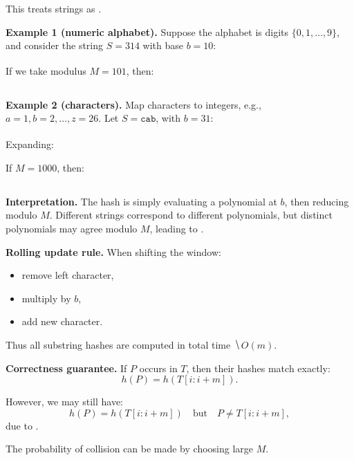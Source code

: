 \documentclass[11pt]{exam}
\begin{document}
This treats strings as .

\vspace{0.5em}

\textbf{Example 1 (numeric alphabet).}
Suppose the alphabet is digits $\{0,1,\dots,9\}$, and consider the string $S = 314$ with base $b = 10$:
\[
\phantom{h(S) = 3 \cdot 10^2 + 1 \cdot 10^1 + 4 \cdot 10^0 = 314.}
\]
If we take modulus $M = 101$, then:
\[
\phantom{h(S) = 314 \bmod 101 = 11.}
\]

\vspace{0.5em}

\textbf{Example 2 (characters).}
Map characters to integers, e.g., $a=1, b=2, \dots, z=26$.  
Let $S = \texttt{cab}$, with $b = 31$:
\[
\phantom{h(S) = 3 \cdot 31^2 + 1 \cdot 31^1 + 2 \cdot 31^0.}
\]
Expanding:
\[
\phantom{h(S) = 3 \cdot 961 + 1 \cdot 31 + 2 = 2883 + 31 + 2 = 2916.}
\]
If $M = 1000$, then:
\[
\phantom{h(S) = 2916 \bmod 1000 = 916.}
\]

\vspace{0.5em}

\textbf{Interpretation.}
The hash is simply evaluating a polynomial at $b$, then reducing modulo $M$.  
Different strings correspond to different polynomials, but distinct polynomials may agree modulo $M$, leading to .
\vspace{0.5in}

\textbf{Rolling update rule.}
When shifting the window:
\begin{itemize}
    \item remove left character,
    \item multiply by $b$,
    \item add new character.
\end{itemize}

Thus all substring hashes are computed in total time $\hide{O(m)}$.

\vspace{0.5in}

\textbf{Correctness guarantee.}
If $P$ occurs in $T$, then their hashes match exactly:
\[
h(P) = h(T[i:i+m]).
\]

However, we may still have:
\[
h(P) = h(T[i:i+m]) \quad \text{but} \quad P \neq T[i:i+m],
\]
due to .

\vspace{0.5em}

The probability of collision can be made  by choosing large $M$.
\end{document}
